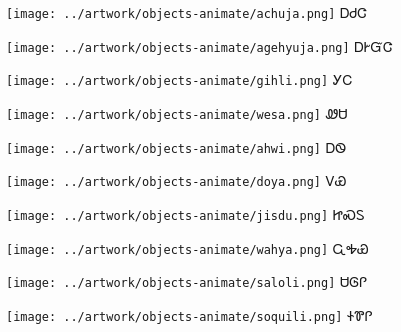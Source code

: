 \documentclass[avery5371,frame]{flashcards}%
\begin{document}
\begin{flashcard}{
\texttt{[image: ../artwork/objects-animate/achuja.png]}
}
\Huge ᎠᏧᏣ
\end{flashcard}

\begin{flashcard}{
\texttt{[image: ../artwork/objects-animate/agehyuja.png]}
}
\Huge ᎠᎨᏳᏣ
\end{flashcard}


\begin{flashcard}{
\texttt{[image: ../artwork/objects-animate/gihli.png]}
}
\Huge ᎩᏟ
\end{flashcard}

\begin{flashcard}{
\texttt{[image: ../artwork/objects-animate/wesa.png]}
}
\Huge ᏪᏌ
\end{flashcard}

\begin{flashcard}{
\texttt{[image: ../artwork/objects-animate/ahwi.png]}
}
\Huge ᎠᏫ
\end{flashcard}

\begin{flashcard}{
\texttt{[image: ../artwork/objects-animate/doya.png]}
}
\Huge ᏙᏯ
\end{flashcard}

\begin{flashcard}{
\texttt{[image: ../artwork/objects-animate/jisdu.png]}
}
\Huge ᏥᏍᏚ
\end{flashcard}
\begin{flashcard}{
\texttt{[image: ../artwork/objects-animate/wahya.png]}
}
\Huge ᏩᎭᏯ
\end{flashcard}

\begin{flashcard}{
\texttt{[image: ../artwork/objects-animate/saloli.png]}
}
\Huge ᏌᎶᎵ
\end{flashcard}

\begin{flashcard}{
\texttt{[image: ../artwork/objects-animate/soquili.png]}
}
\Huge ᏐᏈᎵ
\end{flashcard}
\end{document}
